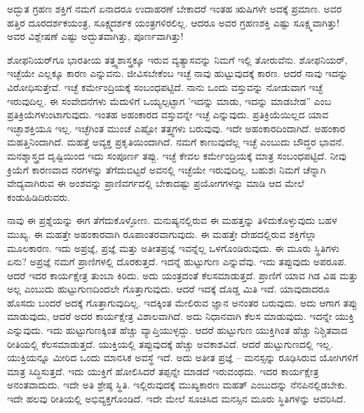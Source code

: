 ಅದ್ಭುತ ಗ್ರಹಣ ಶಕ್ತಿಗೆ ನಮಗೆ ಏನಾದರೂ ಉದಾಹರಣೆ ಬೇಕಾದರೆ ಇಂತಹ ಋಷಿಗಳೇ ಅದಕ್ಕೆ ಪ್ರಮಾಣ. ಅವರ ಹತ್ತಿರ ದೂರದರ್ಶಕಯಂತ್ರ, ಸೂಕ್ಷ್ಮದರ್ಶಕ ಯಂತ್ರಗಳಿರಲಿಲ್ಲ. ಆದರೂ ಅವರ ಗ್ರಹಣಶಕ್ತಿ ಎಷ್ಟು ಸೂಕ್ಷ್ಮವಾಗಿತ್ತು! ಅವರ ವಿಶ್ಲೇಷಣೆ ಎಷ್ಟು ಅದ್ಭುತವಾಗಿತ್ತು, ಪೂರ್ಣವಾಗಿತ್ತು!

ಶೋಫನಿಯರ್‌ಗೂ ಭಾರತೀಯ ತತ್ತ್ವಶಾಸ್ತ್ರಕ್ಕೂ ಇರುವ ವ್ಯತ್ಯಾಸವನ್ನು ನಿಮಗೆ ಇಲ್ಲಿ ತೋರುವೆನು. ಶೋಫನಿಯರ್, ಇಚ್ಛೆಯೇ ಎಲ್ಲಕ್ಕೂ ಕಾರಣ ಎನ್ನುವನು. ಜೀವಿಸಬೇಕೆಂಬ ಇಚ್ಛೆ ನಾವು ಹುಟ್ಟುವುದಕ್ಕೆ ಕಾರಣ. ಆದರೆ ನಾವು ಇದನ್ನು ವಿರೋಧಿಸುತ್ತೇವೆ. ಇಚ್ಛೆ ಕರ್ಮೇಂದ್ರಿಯಕ್ಕೆ ಸಂಬಂಧಪಟ್ಟಿದೆ. ನಾನು ಒಂದು ವಸ್ತುವನ್ನು ನೋಡುವಾಗ ಇಚ್ಛೆ ಇರುವುದಿಲ್ಲ. ಈ ಸಂವೇದನೆಗಳು ಮೆದುಳಿಗೆ ಒಯ್ಯಲ್ಪಟ್ಟಾಗ 'ಇದನ್ನು ಮಾಡು, ಇದನ್ನು ಮಾಡಬೇಡ” ಎಂಬ ಪ್ರತಿಕ್ರಿಯೆಗಳುಂಟಾಗುವುದು. ಇಂತಹ ಅಹಂಕಾರದ ವಸ್ತುವನ್ನೇ ಇಚ್ಛೆ ಎನ್ನುವುದು. ಪ್ರತಿಕ್ರಿಯೆಯಿಲ್ಲದ ಯಾವ ಇಚ್ಛಾಶಕ್ತಿಯೂ ಇಲ್ಲ. ಇಚ್ಛೆಗಿಂತ ಮುಂಚೆ ಎಷ್ಟೋ ತತ್ತ್ವಗಳು ಬರುವುವು. ಇದೇ ಅಹಂಕಾರದಿಂದಾಗಿದೆ. ಅಹಂಕಾರ ಮಹತ್ತಿನಿಂದಾಗಿದೆ. ಮಹತ್ತೆ ಅವ್ಯಕ್ತ ಪ್ರಕೃತಿಯಿಂದಾಗಿದೆ. ನಮಗೆ ಕಾಣುವುದೆಲ್ಲ ಇಚ್ಛೆ ಎಂಬುದು ಬೌದ್ಧರ ಭಾವನೆ. ಮನಶ್ಶಾಸ್ತ್ರದ ದೃಷ್ಟಿಯಿಂದ ಇದು ಸಂಪೂರ್ಣ ತಪ್ಪು. ಇಚ್ಛೆ ಕೇವಲ ಕರ್ಮೇಂದ್ರಿಯಕ್ಕೆ ಮಾತ್ರ ಸಂಬಂಧಪಟ್ಟಿದೆ. ನೀವು ಕ್ರಿಯೆಗೆ ಕಾರಣವಾದ ನರಗಳನ್ನು ತೆಗೆದುಬಿಟ್ಟರೆ ಅವನಲ್ಲಿ ಇಚ್ಛೆಯೇ ಇರುವುದಿಲ್ಲ. ಬಹುಶಃ ನಿಮಗೆ ಚೆನ್ನಾಗಿ ವೇದ್ಯವಾಗಿರುವ ಈ ಅಂಶವನ್ನು ಪ್ರಾಣಿವರ್ಗದಲ್ಲಿ ಬೇಕಾದಷ್ಟು ಪ್ರಯೋಗಗಳನ್ನು ಮಾಡಿ ಆದ ಮೇಲೆ ಕಂಡುಹಿಡಿದಿರುವರು.

ನಾವು ಈ ಪ್ರಶ್ನೆಯನ್ನು ಈಗ ತೆಗೆದುಕೊಳ್ಳೋಣ. ಮನುಷ್ಯನಲ್ಲಿರುವ ಈ ಮಹತ್ತನ್ನು ತಿಳಿದುಕೊಳ್ಳುವುದು ಬಹಳ ಮುಖ್ಯ. ಈ ಮಹತ್ತೇ ಅಹಂಕಾರವಾಗಿ ರೂಪಾಂತರವಾಗುವುದು. ಈ ಮಹತ್ತೇ ದೇಹದಲ್ಲಿರುವ ಶಕ್ತಿಗೆಲ್ಲಾ ಮೂಲಕಾರಣ. ಇದು ಅಪ್ರಜ್ಞೆ, ಪ್ರಜ್ಞೆ ಮತ್ತು ಅತೀತಪ್ರಜ್ಞೆ ಇವನ್ನೆಲ್ಲ ಒಳಗೊಂಡಿರುವುದು. ಈ ಮೂರು ಸ್ಥಿತಿಗಳು ಏನು? ಅಪ್ರಜ್ಞೆ ನಮಗೆ ಪ್ರಾಣಿಗಳಲ್ಲಿ ದೊರಕುತ್ತದೆ. ಇದನ್ನೆ ಹುಟ್ಟುಗುಣ ಎನ್ನುವೆವು. ಇದು ತಪ್ಪುವುದು ಅಪರೂಪ. ಆದರೆ ಇದರ ಕಾರ್ಯಕ್ಷೇತ್ರ ತುಂಬಾ ಕಿರಿದು. ಅದು ಯಂತ್ರದಂತೆ ಕೆಲಸಮಾಡುತ್ತದೆ. ಪ್ರಾಣಿಗೆ ಯಾವ ಗಿಡ ವಿಷ ಮತ್ತು ಅಲ್ಲ ಎಂಬುದು ಹುಟ್ಟುಗುಣದಿಂದಲೇ ಗೊತ್ತಾಗುವುದು. ಆದರೆ ಇದಕ್ಕೆ ದೊಡ್ಡ ಮಿತಿ ಇದೆ. ಯಾವುದಾದರೂ ಹೊಸದು ಬಂದರೆ ಅದಕ್ಕೆ ಗೊತ್ತಾಗುವುದಿಲ್ಲ. ಇದಕ್ಕಿಂತ ಮೇಲಿರುವ ಜ್ಞಾನ ಅನಂತರ ಬರುವುದು. ಅದು ಆಗಾಗ ತಪ್ಪು ಮಾಡುವುದು, ಆದರೆ ಅದರ ಕಾರ್ಯಕ್ಷೇತ್ರ ವಿಶಾಲವಾಗಿದೆ. ಅದು ನಿಧಾನವಾಗಿ ಕೆಲಸ ಮಾಡುವುದು. ಇದನ್ನೇ ಯುಕ್ತಿ ಎನ್ನುವುದು. ಇದು ಹುಟ್ಟುಗುಣಕ್ಕಿಂತ ಹೆಚ್ಚು ವ್ಯಾಪ್ತಿಯುಳ್ಳದ್ದು. ಆದರೆ ಹುಟ್ಟುಗುಣ ಯುಕ್ತಿಗಿಂತ ಹೆಚ್ಚು ನಿಶ್ಚಿತವಾದ ರೀತಿಯಲ್ಲಿ ಕೆಲಸಮಾಡುತ್ತದೆ. ಯುಕ್ತಿಯಲ್ಲಿ ತಪ್ಪುವುದಕ್ಕೆ ಹೆಚ್ಚು ಅವಕಾಶವಿದೆ. ಆದರೆ ಹುಟ್ಟುಗುಣದಲ್ಲಿ ಇಲ್ಲ. ಯುಕ್ತಿಯನ್ನೂ ಮೀರಿದ ಒಂದು ಮಾನಸಿಕ ಅವಸ್ಥೆ ಇದೆ. ಅದು ಅತೀತ ಪ್ರಜ್ಞೆ – ಮನಸ್ಸನ್ನು ರೂಢಿಸಿರುವ ಯೋಗಿಗಳಿಗೆ ಮಾತ್ರ ಸಿದ್ಧಿಸುತ್ತದೆ. ಇದು ಯುಕ್ತಿಗೆ ಹೋಲಿಸಿದರೆ ತಪ್ಪನ್ನೇ ಮಾಡದೆ ಇರುವಂಥದು. ಇದರ ಕಾರ್ಯಕ್ಷೇತ್ರ ಅನಂತವಾದುದು. ಇದೇ ಅತಿ ಶ್ರೇಷ್ಠ ಸ್ಥಿತಿ. ಇಲ್ಲಿರುವುದಕ್ಕೆ ಮುಖ್ಯಕಾರಣ ಮಹತ್ ಎಂಬುದನ್ನು ನೆನಪಿನಲ್ಲಿಡಬೇಕು. ಇದೇ ಹಲವು ರೀತಿಯಲ್ಲಿ ಅಭಿವ್ಯಕ್ತಗೊಂಡಿದೆ. ಇದೇ ಮೇಲೆ ಸೂಚಿಸಿದ ಮನಸ್ಸಿನ ಮೂರು ಸ್ಥಿತಿಗಳನ್ನು ಆವರಿಸಿದೆ.

